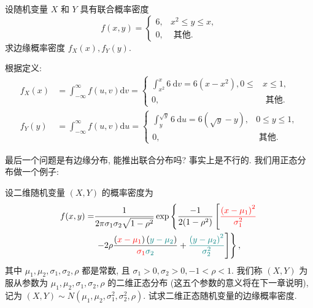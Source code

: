     \begin{example}
      设随机变量 $X$ 和 $Y$ 具有联合概率密度
            $$
                f(x, y)= \begin{cases}6, & x^2 \leqslant y \leqslant x, \\ 0, & \text { 其他. }\end{cases}
            $$
            求边缘概率密度 $f_X(x), f_Y(y)$.
    \end{example}

    \begin{solution}根据定义:
      $$\begin{aligned}
              f_X(x) & =\int_{-\infty}^{\infty} f(u, v) \mathrm{d} v= \begin{cases}\int_{x^2}^x 6 \mathrm{~d} v=6\left(x-x^2\right), 0 \leqslant & x \leqslant 1, \\
           0,                                                            & \text { 其他. }\end{cases}               \\
              f_Y(y) & =\int_{-\infty}^{\infty} f(u, v) \mathrm{d} u = \begin{cases}\int_y^{\sqrt{y}} 6 \mathrm{~d} u=6(\sqrt{y}-y), & 0 \leqslant y \leqslant 1, \\
           0,                                               & \text { 其他. }\end{cases}
          \end{aligned}
      $$
  \end{solution}

  最后一个问题是有边缘分布, 能推出联合分布吗? 事实上是不行的. 我们用正态分布做一个例子: 

  \begin{example}
    设二维随机变量 $(X, Y)$ 的概率密度为
    $$
        \begin{aligned}
            f(x, y)= &
            \frac{1}{2 \pi \sigma_1 \sigma_2 \sqrt{1-\rho^2}}
            \exp \left\{
            \frac { - 1 } { 2 ( 1 - \rho ^ { 2 } ) }
            \left[{\color{red}\frac{\left(x-\mu_1\right)^2}{\sigma_1^2}}\right.\right. \\
                     & \left.\left.-2 \rho
            \frac{\left({\color{red}x-\mu_1}\right)\left({\color{teal}y-\mu_2}\right)}{{\color{red}\sigma_1} {\color{teal}\sigma_2}}
            +{\color{teal}\frac{\left(y-\mu_2\right)^2}{\sigma_2^2}}\right]\right\},
        \end{aligned}
    $$
    其中 $\mu_1, \mu_2, \sigma_1, \sigma_2, \rho$ 都是常数, 且 $\sigma_1>0, \sigma_2>0,-1<\rho<1$. 我们称 $(X, Y)$ 为服从参数为 $\mu_1, \mu_2, \sigma_1, \sigma_2, \rho$ 的二维正态分布 (这五个参数的意义将在下一章说明), 记为 $(X, Y) \sim N\left(\mu_1, \mu_2, \sigma_1^2, \sigma_2^2, \rho\right)$. 试求二维正态随机变量的边缘概率密度.
\end{example}

